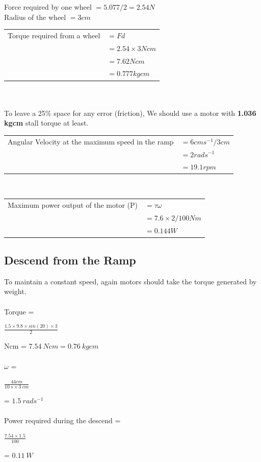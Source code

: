 \documentclass[a4paper, 12pt]{article}
\begin{document}
Force required by one wheel $= 5.077/2 = 2.54 N $\\
Radius of the wheel $= 3cm$\\
\begin{tabular}{l l}
     Torque required from a wheel &$ = Fd$\\
			            &$= 2.54 \times 3 Ncm$\\
			            &$= 7.62 Ncm$  \\    
			            &$= 0.777 kgcm$\\
\end{tabular}
\\
\\      
To leave a 25\% space for any error (friction), We should use a motor with \textbf{1.036 kgcm} stall torque at least.\\

\begin{tabular}{l l}
   Angular Velocity at the maximum speed in the ramp & $= 6 cms^{-1}/ 3 cm$\\
						         &$= 2 rads^{-1}$\\
						        &$= 19.1 rpm$\\
\end{tabular}\\
\begin{tabular}{l l}
Maximum power output of the motor (P) & $= \tau \omega $\\
							   &$= 7.6 \times 2 / 100 Nm$\\
							   &$= 0.144 W$\\
\end{tabular}

\subsection*{Descend from the Ramp}
To maintain a constant speed, again motors should take the torque generated by weight.\\
\\
Torque = \begin{Large}$\frac{1.5\times 9.8 \times sin(20) \times 3}{2}$\end{Large} Ncm = $7.54\ Ncm = 0.76\ kgcm$\\
\\
$\omega$ = \begin{Large}$\frac{44 cm}{10\ s \times 3\ cm}$\end{Large} = $1.5\ rads^{-1}$\\
\\
Power required during the descend = \begin{Large}$\frac{7.54 \times 1.5}{100}$\end{Large} = $0.11\ W$
\end{document}
